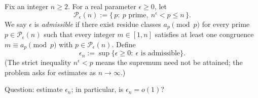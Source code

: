 Fix an integer $n\ge 2$. For a real parameter $\epsilon\ge 0$, let
\[
\mathcal P_\epsilon(n):=\{\,p:\ p\text{ prime},\ n^\epsilon<p\le n\,\}.
\]
We say $\epsilon$ is \emph{admissible} if there exist residue classes $a_p\pmod p$ for every prime $p\in\mathcal P_\epsilon(n)$ such that
every integer $m\in[1,n]$ satisfies at least one congruence $m\equiv a_p\pmod p$ with $p\in\mathcal P_\epsilon(n)$.
Define
\[
\epsilon_n:=\sup\{\epsilon\ge 0:\ \epsilon\text{ is admissible}\}.
\]
(The strict inequality $n^\epsilon<p$ means the supremum need not be attained; the problem asks for estimates as $n\to\infty$.)

Question: estimate $\epsilon_n$; in particular, is $\epsilon_n=o(1)$?
